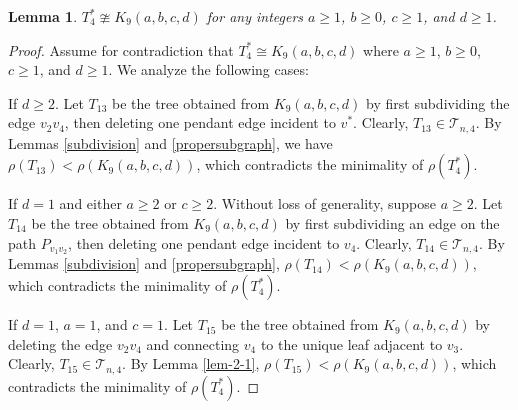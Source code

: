 \documentclass[12pt]{amsart}
\newtheorem{lem}{Lemma}[section]
\begin{document}
\begin{lem}\label{claim-3.15}
	$T_4^* \ncong K_9(a,b,c,d)$ for any integers $a \ge 1$, $b \ge 0$, $c \ge 1$, and $d \ge 1$.
\end{lem}

\begin{proof}
	Assume for contradiction that $T_4^* \cong K_9(a,b,c,d)$ where $a \ge 1$, $b \ge 0$, $c \ge 1$, and $d \ge 1$. We analyze the following cases:
	
	If $d \ge 2$.
	Let $T_{13}$ be the tree obtained from $K_9(a,b,c,d)$ by first subdividing the edge $v_2v_4$, then deleting one pendant edge incident to $v^*$.
	Clearly, $T_{13} \in \mathcal{T}_{n,4}$.
	By Lemmas \ref{subdivision} and \ref{propersubgraph}, we have $\rho(T_{13}) < \rho(K_9(a,b,c,d))$, which contradicts the minimality of $\rho(T_4^*)$.
	
	If $d = 1$ and either $a \ge 2$ or $c \ge 2$.
	Without loss of generality, suppose $a \ge 2$.
	Let $T_{14}$ be the tree obtained from $K_9(a,b,c,d)$ by first subdividing an edge on the path $P_{v_1v_2}$, then deleting one pendant edge incident to $v_4$.
	Clearly, $T_{14} \in \mathcal{T}_{n,4}$.
	By Lemmas \ref{subdivision} and \ref{propersubgraph}, $\rho(T_{14}) < \rho(K_9(a,b,c,d))$, which contradicts the minimality of $\rho(T_4^*)$.
	
	If $d = 1$, $a = 1$, and $c = 1$.
	Let $T_{15}$ be the tree obtained from $K_9(a,b,c,d)$ by deleting the edge $v_2v_4$ and connecting $v_4$ to the unique leaf adjacent to $v_3$.
	Clearly, $T_{15} \in \mathcal{T}_{n,4}$.
	By Lemma \ref{lem-2-1}, $\rho(T_{15}) < \rho(K_9(a,b,c,d))$, which contradicts the minimality of $\rho(T_4^*)$.
\end{proof}
\end{document}
